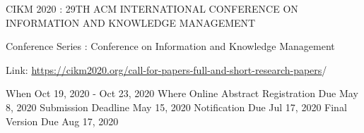 CIKM 2020 : 29TH ACM INTERNATIONAL CONFERENCE ON INFORMATION AND KNOWLEDGE MANAGEMENT

Conference Series : Conference on Information and Knowledge Management
 
Link: 
\url{https://cikm2020.org/call-for-papers-full-and-short-research-papers}/
 
When	Oct 19, 2020 - Oct 23, 2020
Where	Online
Abstract Registration Due	May 8, 2020
Submission Deadline	May 15, 2020
Notification Due	Jul 17, 2020
Final Version Due	Aug 17, 2020

